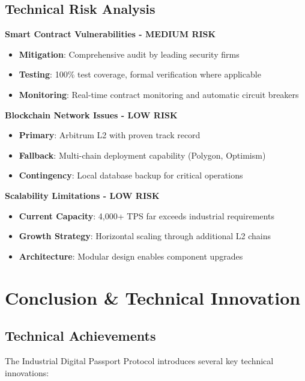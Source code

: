 \documentclass[11pt,a4paper]{article}
\begin{document}
\subsection{Technical Risk Analysis}

\textbf{Smart Contract Vulnerabilities - MEDIUM RISK}
\begin{itemize}[leftmargin=0.5cm]
    \item \textbf{Mitigation}: Comprehensive audit by leading security firms
    \item \textbf{Testing}: 100\% test coverage, formal verification where applicable
    \item \textbf{Monitoring}: Real-time contract monitoring and automatic circuit breakers
\end{itemize}

\textbf{Blockchain Network Issues - LOW RISK}
\begin{itemize}[leftmargin=0.5cm]
    \item \textbf{Primary}: Arbitrum L2 with proven track record
    \item \textbf{Fallback}: Multi-chain deployment capability (Polygon, Optimism)
    \item \textbf{Contingency}: Local database backup for critical operations
\end{itemize}

\textbf{Scalability Limitations - LOW RISK}
\begin{itemize}[leftmargin=0.5cm]
    \item \textbf{Current Capacity}: 4,000+ TPS far exceeds industrial requirements
    \item \textbf{Growth Strategy}: Horizontal scaling through additional L2 chains
    \item \textbf{Architecture}: Modular design enables component upgrades
\end{itemize}

\section{Conclusion \& Technical Innovation}

\subsection{Technical Achievements}

The Industrial Digital Passport Protocol introduces several key technical innovations:
\end{document}
